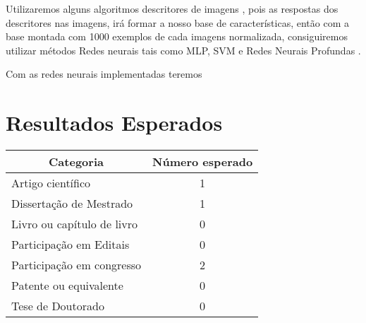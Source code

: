 \documentclass[12pt,a4paper,oneside]{book}
\begin{document}
Utilizaremos alguns algoritmos descritores de imagens
\cite[Descritores]{einstein}, pois as respostas dos descritores nas imagens,
ir\'{a} formar a nosso base de caracter\'{i}sticas, ent\~{a}o com a base montada
com 1000 exemplos de cada imagens normalizada, consiguiremos utilizar
m\'{e}todos Redes neurais \cite[Redes-neurais]{einstein} tais como MLP, SVM e
Redes Neurais Profundas \cite[Deep-learn]{einstein}.

Com as redes neurais implementadas teremos
\pagebreak
\chapter{Resultados Esperados}
\begin{center}
    \begin{tabular}{|l|c|}
        \hline
        \multicolumn{1}{|c|}{Categoria} & \multicolumn{1}{|c|}{N\'{u}mero
        esperado} \\ \hline
        Artigo cient\'{i}fico & 1 \\ \hline
        Disserta\c{c}\~{a}o de Mestrado & 1 \\ \hline
        Livro ou cap\'{i}tulo de livro & 0 \\ \hline
        Participa\c{c}\~{a}o em Editais & 0 \\ \hline
        Participa\c{c}\~{a}o em congresso & 2 \\ \hline
        Patente ou equivalente & 0 \\ \hline
        Tese de Doutorado & 0 \\ \hline
    \end{tabular}
\end{center}
\pagebreak
\end{document}
